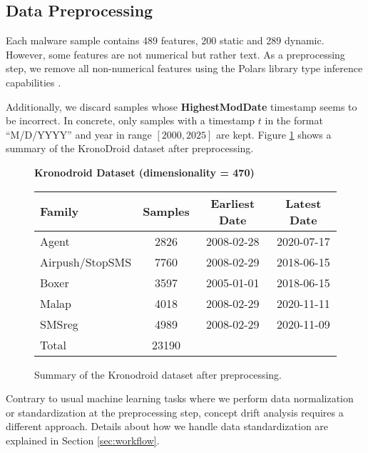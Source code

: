 \subsection{Data Preprocessing}
Each malware sample contains 489 features, 200 static and 289 dynamic. However, some features
are not numerical but rather text.
As a preprocessing step, we remove all non-numerical features using the Polars library
type inference capabilities \cite{polarsdatatypes}.

Additionally, we discard samples whose \textbf{HighestModDate} timestamp seems
to be incorrect. In concrete, only samples with a timestamp
$t$ in the format ``M/D/YYYY'' and year in range $[2000, 2025]$ are kept.
Figure \ref{fig:kronodroid_summary} shows a summary of the KronoDroid dataset
after preprocessing.

\begin{figure}[h!]
    \begin{center}
        \textbf{Kronodroid Dataset (dimensionality = 470)}
        \vspace{0.5cm}

        \begin{tabular}{lccc}
            \toprule
            \textbf{Family} & \textbf{Samples} & \textbf{Earliest Date} & \textbf{Latest Date} \\
            \midrule
            Agent           & 2826             & 2008-02-28             & 2020-07-17           \\
            Airpush/StopSMS & 7760             & 2008-02-29             & 2018-06-15           \\
            Boxer           & 3597             & 2005-01-01             & 2018-06-15           \\
            Malap           & 4018             & 2008-02-29             & 2020-11-11           \\
            SMSreg          & 4989             & 2008-02-29             & 2020-11-09           \\
            \bottomrule
            Total           & 23190                                                            \\
        \end{tabular}
        \caption{Summary of the Kronodroid dataset after preprocessing.}
        \label{fig:kronodroid_summary}
    \end{center}
\end{figure}

Contrary to usual machine learning tasks where we perform data normalization or standardization
at the preprocessing step, concept drift analysis requires a different approach. Details about
how we handle data standardization are explained in Section \ref{sec:workflow}.

